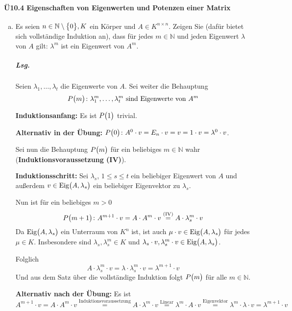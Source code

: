 \documentclass{scrreprt}
\begin{document}
\paragraph{Ü10.4 Eigenschaften von Eigenwerten und Potenzen einer Matrix}
\begin{enumerate}[(a)]
\item Es seien $n \in \mathbb{N} \setminus \qty\big{0}, K$ ein Körper und
  $A \in K^{n \times n}$.
  Zeigen Sie (dafür bietet sich vollständige Induktion an), dass für jedes
  $m \in \mathbb{N}$ und jeden Eigenwert $\lambda$ von $A$ gilt:
  $\lambda^m$ ist ein Eigenwert von $A^m$.

  \subparagraph{Lsg.} Seien $\lambda_1, \ldots, \lambda_t$ die Eigenwerte von
  $A$.
  Sei weiter die Behauptung
  \[
    P\qty\big(m) \colon \lambda_1^m, \ldots, \lambda_t^m
    \text{ sind Eigenwerte von } A^m
  \]

  \textbf{Induktionsanfang:} Es ist $P\qty\big(1)$ trivial.

  \textbf{Alternativ in der Übung:} $P\qty\big(0) \colon A^0 \cdot v
  = E_n \cdot v = v = 1 \cdot v = \lambda^0 \cdot v$.

  Sei nun die Behauptung $P\qty\big(m)$ für ein beliebiges $m \in \mathbb{N}$
  wahr (\textbf{Induktionsvoraussetzung (IV)}).

  \textbf{Induktionsschritt:} Sei $\lambda_s$, $1 \leq s \leq t$ ein beliebiger
  Eigenwert von $A$ und außerdem $v \in \text{Eig}\qty\big(A, \lambda_s)$ ein
  beliebiger Eigenvektor zu $\lambda_s$.

  Nun ist für ein beliebiges $m > 0$
  \[
    P\qty\big(m + 1) \colon A^{m + 1} \cdot v = A \cdot A^m \cdot v
    \overset{\text{(IV)}}= A \cdot \lambda_s^m \cdot v
  \]
  Da $\text{Eig}\qty\big(A, \lambda_s)$ ein Unterraum von $K^n$ ist, ist auch
  $\mu \cdot v \in \text{Eig}\qty\big(A, \lambda_s)$ für jedes $\mu \in K$.
  Insbesondere sind $\lambda_s, \lambda_s^m \in K$ und
  $\lambda_s \cdot v, \lambda_s^m \cdot v \in \text{Eig}\qty\big(A, \lambda_s)$.

  Folglich
  \[
    A \cdot \lambda_s^m \cdot v = \lambda \cdot \lambda_s^m \cdot v
    = \lambda^{m + 1} \cdot v
  \]
  Und aus dem Satz über die vollständige Induktion folgt $P\qty\big(m)$ für alle
  $m \in \mathbb{N}$.

  \textbf{Alternativ nach der Übung:} Es ist
  \[
    A^{m + 1} \cdot v = A \cdot A^m \cdot v
    \overset{\text{Induktionsvoraussetzung}}= A \cdot \lambda^m \cdot v
    \overset{\text{Linear}}= \lambda^m \cdot A \cdot v
    \overset{\text{Eigenvektor}}= \lambda^m \cdot \lambda \cdot v
    = \lambda^{m + 1} \cdot v
  \]


\end{enumerate}
\end{document}
